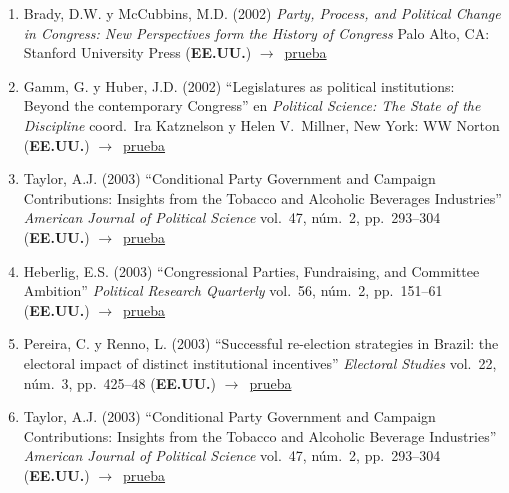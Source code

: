 \documentclass[12 pt, letter]{article}
\newenvironment{CitasMiTrabajo}{
    \begin{footnotesize}
    \begin{enumerate}[label={\footnotesize\emph{cita~\arabic*}},ref=\arabic*] %
        \setlength{\itemsep}{.1\itemsep}
        \setlength{\parskip}{.1\parskip}
    }{\end{enumerate}\end{footnotesize}}
\begin{document}
\begin{CitasMiTrabajo}
        \item Brady, D.W. y McCubbins, M.D. (2002)
        \emph{Party, Process, and Political Change in Congress: New Perspectives form the History of
        Congress} Palo Alto, CA: Stanford University Press  (\textbf{EE.UU.}) $\rightarrow$~\href{http://ericmagar.com/cv/cites/coxMagar/brady.pdf}{prueba}

        \item Gamm, G. y  Huber, J.D. (2002)
        ``Legislatures as political
        institutions: Beyond the contemporary Congress'' en \emph{Political
        Science: The State of the Discipline} coord.\ Ira Katznelson y Helen
        V.\ Millner, New York: WW Norton  (\textbf{EE.UU.}) $\rightarrow$~\href{http://ericmagar.com/cv/cites/coxMagar/gamm.pdf}{prueba}

        \item Taylor, A.J. (2003)
        ``Conditional Party Government and Campaign Contributions: Insights
        from the Tobacco and Alcoholic Beverages Industries'' \emph{American
        Journal of Political Science} vol.\ 47, n\'um.\ 2, pp.\ 293--304  (\textbf{EE.UU.}) $\rightarrow$~\href{http://ericmagar.com/cv/cites/coxMagar/taylor.pdf}{prueba}

        \item Heberlig, E.S. (2003)
        ``Congressional Parties, Fundraising, and Committee Ambition'' \emph{Political Research Quarterly} vol.\ 56, n\'um.\ 2, pp.\ 151--61
        (\textbf{EE.UU.}) $\rightarrow$~\href{http://ericmagar.com/cv/cites/coxMagar/heber.pdf}{prueba}

        \item Pereira, C. y Renno, L. (2003)
        ``Successful re-election strategies in Brazil: the electoral impact of distinct
        institutional incentives'' \emph{Electoral Studies} vol.\ 22, n\'um.\ 3, pp.\
        425--48  (\textbf{EE.UU.}) $\rightarrow$~\href{http://ericmagar.com/cv/cites/coxMagar/perRenno2.pdf}{prueba}

        \item Taylor, A.J. (2003)
        ``Conditional Party Government and Campaign
        Contributions: Insights from the Tobacco and Alcoholic Beverage Industries''
        \emph{American Journal of Political Science}
        vol.\ 47, n\'um.\ 2, pp.\ 293--304 (\textbf{EE.UU.}) $\rightarrow$~\href{http://ericmagar.com/cv/cites/coxMagar/taylos2.pdf}{prueba}


\end{CitasMiTrabajo}
\end{document}
